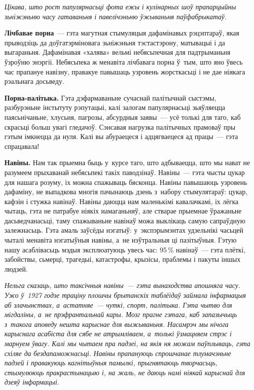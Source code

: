 \emph{Цікава, што рост папулярнасьці фота ежы і кулінарных шоў прапарцыйны зьніжэньню часу гатаваньня і павелічэньню ўжываньня паўфабрыкатаў.}

\textbf{Лічбавае порна}~--- гэта магутная стымуляцыя дафамінавых рэцэптараў, якая прыводзіць да доўгатэрміновага зьніжэньня тэстастэрону, матывацыі і да выгараньня. Дафамінавая «халява» вельмі небясьпечная для падтрыманьня ўзроўню энэргіі. Небясьпека ж менавіта лічбавага порна ў~тым, што яно ўвесь час прапануе навізну, правакуе павышаць узровень жорсткасьці і не дае ніякага рэальнага досьведу. 


\textbf{Порна-палітыка.} Гэта дэфармаваньне сучаснай палітычнай сыстэмы, разбурэньне інстытуту рэпутацыі, калі залогам папулярнасьці зьяўляецца паясьнічаньне, хлусьня, пагрозы, абсурдныя заявы~--- усё толькі для таго, каб скрасьці больш увагі гледачоў. Сэнсавая нагрузка палітычных прамоваў пры гэтым імкнецца да нуля. Калі вы абураецеся і адцягваецеся ад працы~--- гэта спрацавала!

\textbf{Навіны.} Нам так прыемна быць у~курсе таго, што адбываецца, што мы нават не разумеем прыхаванай небясьпекі такіх паводзінаў. Навіны~--- гэта чысты цукар для нашага розуму, іх можна спажываць бясконца. Навіны павышаюць узровень дафаміну, не выпадкова многія пачынаюць дзень з~набору стымулятараў: цукар, кафэін і стужка навінаў. Навіны даюцца нам маленькімі кавалачкамі, іх лёгка чытаць, гэта не патрабуе ніякіх намаганьняў, але стварае прыемнае ўражаньне дасьведчанасьці, таму спажываньне навінаў можа выклікаць самую сапраўдную залежнасьць. Гэта амаль заўсёды нэгатыў: у~экспэрымэнтах удзельнікі часьцей чыталі менавіта нэгатыўныя навіны, а~не нэўтральныя ці пазітыўныя. Гэтую нашу асаблівасьць мэдыя эксплюатуюць увесь час: 95\,\% навінаў~--- гэта плёткі, забойствы, сьмерці, трагедыі, катастрофы, крызісы, праблемы і пакуты іншых людзей.

\emph{Нельга сказаць, што таксічныя навіны~--- гэта вынаходства апошняга часу. Ужо ў~1927 годзе траціну плошчы брытанскіх таблёідаў займала інфармацыя аб злачынствах, а~астатняе~--- чуткі, спорт, палітыка. Гэта чытво для мігдаліны, а~не прэфрантальнай кары. Мозг прагне гэтага, каб запазычыць з~такога аповеду нешта карыснае для выжываньня. Насамрэч мы нічога карыснага асабіста для сябе не атрымліваем, а~толькі ўзмацняем стрэс і марнуем ўвагу. Калі мы чытаем пра падзеі, на якія ня можам паўплываць, гэта схіляе да бездапаможнасьці. Навіны прапануюць спрошчанае тлумачэньне падзей і правакуюць кагнітыўныя памылкі, прыгнятаюць творчасьць, стымулююць пракрастынацыю і, на жаль, не даюць намі ніякай карыснай для дзеяў інфармацыі.}

